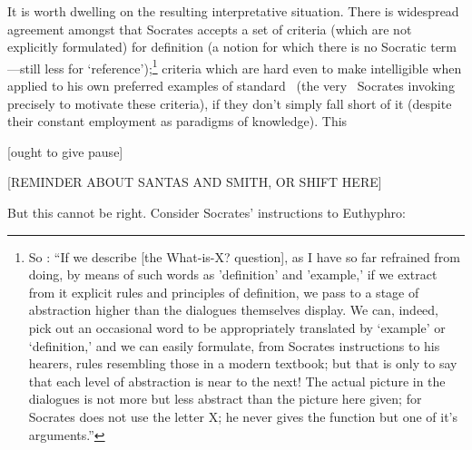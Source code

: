 \documentclass[11pt,letterpaper,oneside]{amsart} %
\begin{document}
It is worth dwelling on the resulting interpretative situation. There is widespread agreement amongst that Socrates accepts a set of criteria (which are not explicitly formulated) for definition (a notion for which there is no Socratic term---still less for `reference');\footnote{So \citet[pp.\ 113-14]{robinson1950definition}: ``If we describe [the What-is-X? question], as I have so far refrained from doing, by means of such words as 'definition' and 'example,' if we extract from it explicit rules and principles of definition, we pass to a stage of abstraction higher than the dialogues themselves display. We can, indeed, pick out an occasional word to be appropriately translated by `example' or `definition,' and we can easily formulate, from Socrates instructions to his hearers, rules resembling those in a modern textbook; but that is only to say that each level of abstraction is near to the next! The actual picture in the dialogues is not more but less abstract than the picture here given; for Socrates does not use the letter X; he never gives the function but one of it's arguments.''} criteria which are hard even to make intelligible when applied to his own preferred examples of standard \technai\ (the very \technai\ Socrates invoking precisely to motivate these criteria), if they don't simply fall short of it (despite their constant employment as paradigms of knowledge). This

[ought to give pause]








[REMINDER ABOUT SANTAS AND SMITH, OR SHIFT HERE]

But this cannot be right. Consider Socrates' instructions to Euthyphro:
\end{document}
